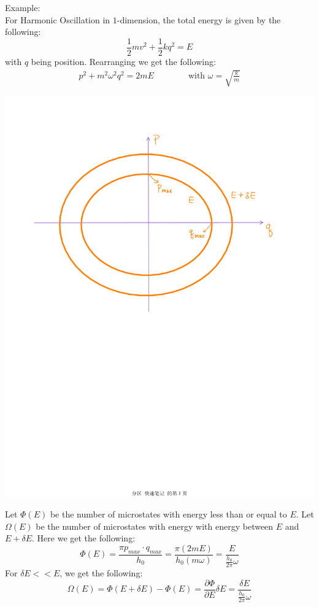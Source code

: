 \documentclass[11pt,oneside]{book}
\theoremstyle{break}
\theoremstyle{break}
\newcommand{\pd}{\partial}
\newcommand{\example}{\color{green}Example: \color{black}}
\begin{document}
\example\\
For Harmonic Oscillation in $1$-dimension, the total energy is given by the following:\\
$$\frac{1}{2}mv^2 + \frac{1}{2}kq^2 = E$$
with $q$ being position. Rearranging we get the following:
\begin{align*}
p^2 + m^2 \omega^2 q^2 = 2mE \qquad\qquad\text{with }\omega = \sqrt{\frac{k}{m}}
\end{align*}
\begin{center}
\includegraphics[scale=0.5]{pqPhaseSpace.pdf}
\end{center}
Let $\Phi(E)$ be the number of microstates with energy less than or equal to $E$. Let $\Omega(E)$ be the number of microstates with energy with energy between $E$ and $E+\delta E$. Here we get the following:
$$\Phi(E) = \frac{\pi p_{max} \cdot q_{max}}{h_0} = \frac{\pi (2mE)}{h_0(m\omega)} = \frac{E}{\frac{h_0}{2\pi} \omega}$$
For $\delta E << E$, we get the following:
$$\Omega(E) = \Phi(E+\delta E) - \Phi(E) = \frac{\partial \Phi}{\pd E}\delta E = \frac{\delta E}{\frac{h_0}{2\pi}\omega}$$
\end{document}
